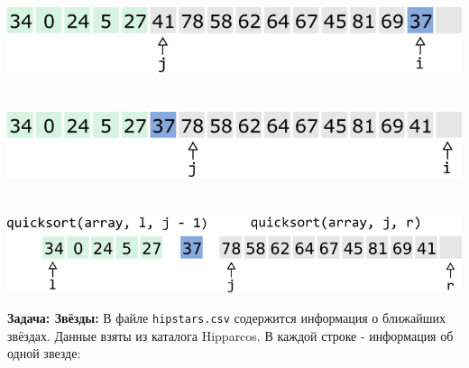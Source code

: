 \documentclass{article}
\begin{document}
\begin{multicols}{2}
\\
\\
\\
\includegraphics[scale=0.53]{../images/qs9.png}
\\
\\
\\
\includegraphics[scale=0.53]{../images/qs10.png}
\\
\\
\\
\includegraphics[scale=0.47]{../images/qs11.png}
\end{multicols}
\newpage
\textbf{Задача: Звёзды:} В файле \texttt{hipstars.csv} содержится информация о ближайших звёздах. Данные взяты из каталога Hipparcos. В каждой строке - информация об одной звезде:
\end{document}
